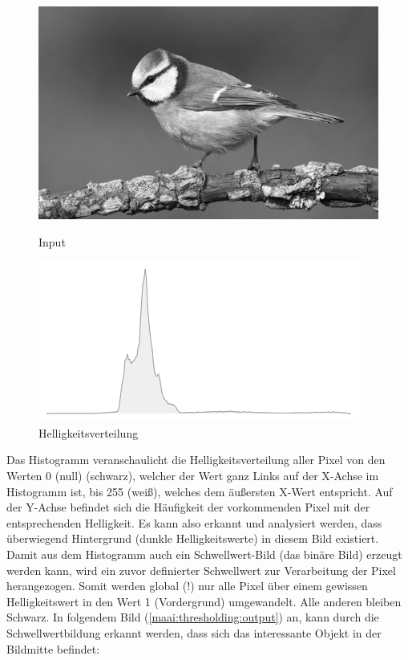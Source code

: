 \begin{figure}[htb]
    \centering
    \begin{minipage}[t]{0.45\linewidth}
        \centering
        \includegraphics[width=\linewidth]{pics/bildverarbeitungsalgos/grayscaling_output.png}
        \caption{Input}
        \label{maai:thresholding:input}
    \end{minipage}
    \hfill
    \begin{minipage}[t]{0.45\linewidth}
        \centering
        \includegraphics[width=\linewidth]{pics/bildverarbeitungsalgos/thresholding_histogram.png}
        \caption{Helligkeitsverteilung}
        \label{maai:thresholding:histogramm}
    \end{minipage}
\end{figure}

Das Histogramm veranschaulicht die Helligkeitsverteilung aller Pixel von den Werten 0 (null) (schwarz), welcher der Wert ganz Links auf der X-Achse im Histogramm ist, bis 255 (weiß), welches dem äußersten X-Wert entspricht. Auf der Y-Achse befindet sich die Häufigkeit der vorkommenden Pixel mit der entsprechenden Helligkeit.
Es kann also erkannt und analysiert werden, dass überwiegend Hintergrund (dunkle Helligkeitswerte) in diesem Bild existiert. Damit aus dem Histogramm auch ein Schwellwert-Bild (das binäre Bild) erzeugt werden kann, wird ein zuvor definierter Schwellwert zur Verarbeitung der Pixel herangezogen. Somit werden global (!) nur alle Pixel über einem gewissen Helligkeitswert in den Wert 1 (Vordergrund) umgewandelt. Alle anderen bleiben Schwarz. In folgendem Bild (\ref{maai:thresholding:output}) an, kann durch die Schwellwertbildung erkannt werden, dass sich das interessante Objekt in der Bildmitte befindet:


